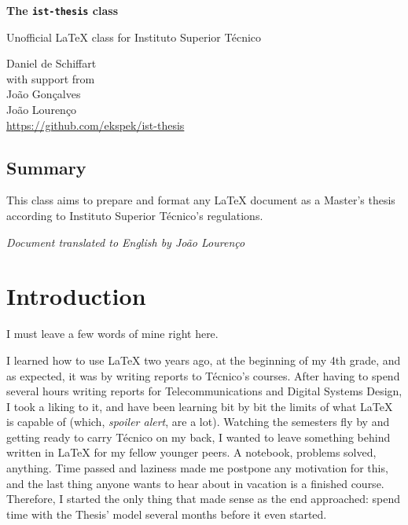\documentclass[english]{ist-thesis}
\begin{document}
\begin{center}
	{\Huge\bfseries The \texttt{ist-thesis} class}
	\par\bigskip
	{\Large Unofficial \LaTeX{} class for Instituto Superior Técnico}
	\par\bigskip\smallskip
	Daniel de Schiffart \\
	{\small with support from} \\
	João Gonçalves \\
	João Lourenço \bigskip \\
	\url{https://github.com/ekspek/ist-thesis} \bigskip \\
\end{center}

\bigskip\bigskip

\begin{center}
	\section*{Summary}
\end{center}
This class aims to prepare and format any \LaTeX{} document as a Master's thesis according to Instituto Superior Técnico's regulations.

\vspace{\fill}
\begin{center}
	\textit{Document translated to English by João Lourenço}
\end{center}

\tableofcontents

\clearpage

\section*{Introduction}

I must leave a few words of mine right here.

I learned how to use \LaTeX{} two years ago, at the beginning of my 4th grade, and as expected, it was by writing reports to Técnico's courses. After having to spend several hours writing reports for Telecommunications and Digital Systems Design, I took a liking to it, and have been learning bit by bit the limits of what \LaTeX{} is capable of (which, \textit{spoiler alert}, are a lot). Watching the semesters fly by and getting ready to carry Técnico on my back, I wanted to leave something behind written in \LaTeX{} for my fellow younger peers. A notebook, problems solved, anything. Time passed and laziness made me postpone any motivation for this, and the last thing anyone wants to hear about in vacation is a finished course. Therefore, I started the only thing that made sense as the end approached: spend time with the Thesis' model several months before it even started.
\end{document}
